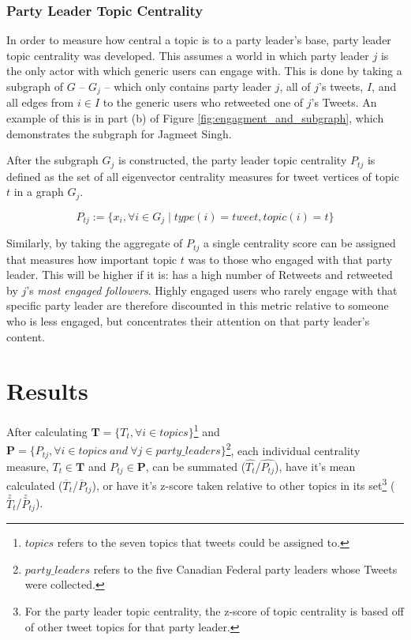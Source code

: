 \subsubsection{Party Leader Topic Centrality}

In order to measure how central a topic is to a party leader's base, party
leader topic centrality was developed. This assumes a world in which party
leader $j$ is the only actor with which generic users can engage with. This is
done by taking a subgraph of $G$ -- $G_{j}$ -- which only contains party leader
$j$, all of $j$'s tweets, $I$, and all edges from $i\in I$ to the generic users
who retweeted one of $j$'s Tweets. An example of this is in part (b) of Figure
\ref{fig:engagment_and_subgraph}, which demonstrates the subgraph for Jagmeet
Singh. 

After the subgraph $G_j$ is constructed, the party leader topic
centrality $P_{tj}$ is defined as the set of all eigenvector centrality measures
for tweet vertices of topic $t$ in a graph $G_{j}$.

\begin{equation}
    P_{tj} := \{ x_i ,  \forall i \in G_{j} \mid type(i)=tweet, topic(i)=t \}
\end{equation}

Similarly, by taking the aggregate of $P_{tj}$ a single centrality score can be
assigned that measures how important topic $t$ was to those who engaged with
that party leader. This will be higher if it is: has a high number of Retweets
and  retweeted by $j$'s \emph{most engaged followers}. Highly engaged users who
rarely engage with that specific party leader are therefore discounted in this
metric relative to someone who is less engaged, but concentrates their attention
on that party leader's content. 

\section{Results}

After calculating $\textbf{T}=\{T_{t}, \forall i \in topics\}$\footnote{$topics$
refers to the seven topics that tweets could be assigned to.} and $\textbf{P}=\{P_{tj}, \forall i \in
topics\:and\:\forall j \in party\_leaders\}$\footnote{$party\_leaders$ refers to
the five Canadian Federal party leaders whose Tweets were collected.}, each individual centrality measure, $T_{t} \in
\textbf{T}$ and $P_{tj}\in \textbf{P}$, can be summated
($\hat{T_{t}}$/$\hat{P_{tj}}$), have it's mean calculated
($\overline{T}_{t}$/$\overline{P}_{tj}$), or have it's z-score taken relative to
other topics in its set\footnote{For the party leader topic centrality, the
z-score of topic centrality is based off of other tweet topics for that party
leader.} ($\stackrel{z}{T}_{t}$/$\stackrel{z}{P}_{tj}$).

